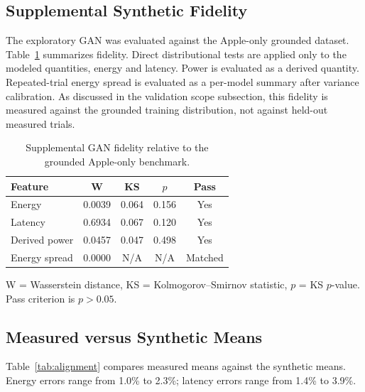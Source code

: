 \documentclass[conference]{IEEEtran}
\begin{document}
\subsection{Supplemental Synthetic Fidelity}
\label{sec:fidelity}
The exploratory GAN was evaluated against the Apple-only grounded dataset.
Table~\ref{tab:fidelity} summarizes fidelity. Direct distributional tests are
applied only to the modeled quantities, energy and latency. Power is evaluated
as a derived quantity. Repeated-trial energy spread is evaluated as a
per-model summary after variance calibration. As discussed in the validation
scope subsection, this fidelity is measured against the grounded training
distribution, not against held-out measured trials.

\begin{table}[ht]
\centering
\caption{Supplemental GAN fidelity relative to the grounded Apple-only benchmark.}
\label{tab:fidelity}
\small
\begin{tabular}{l c c c c}
\toprule
Feature & W & KS & $p$ & Pass \\
\midrule
Energy & 0.0039 & 0.064 & 0.156 & Yes \\
Latency & 0.6934 & 0.067 & 0.120 & Yes \\
Derived power & 0.0457 & 0.047 & 0.498 & Yes \\
Energy spread & 0.0000 & N/A & N/A & Matched \\
\bottomrule
\end{tabular}

\vspace{0.3em}
\footnotesize
W = Wasserstein distance, KS = Kolmogorov--Smirnov statistic, $p$ = KS $p$-value.
Pass criterion is $p > 0.05$.
\end{table}

\subsection{Measured versus Synthetic Means}
Table~\ref{tab:alignment} compares measured means against the synthetic means.
Energy errors range from 1.0\% to 2.3\%; latency errors range from 1.4\% to
3.9\%.
\end{document}
